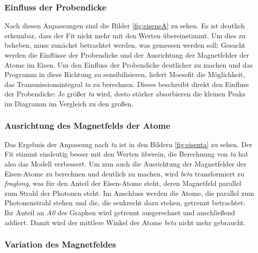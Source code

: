 \documentclass[german, %
parskip=full, %
bibliography=totoc, %
]{scrartcl}
\begin{document}
\subsubsection{Einfluss der Probendicke}

Nach diesen Anpassungen sind die Bilder \ref{fig:eiseneA} zu sehen. Es ist deutlich erkennbar, dass der Fit nicht mehr mit den Werten übereinstimmt. Um dies zu beheben, muss zunächst betrachtet werden, was gemessen werden soll: Gesucht werden die Einflüsse der Probendicke und der Ausrichtung der Magnetfelder der Atome im Eisen. Um den Einfluss der Probendicke deutlicher zu machen und das Programm in diese Richtung zu sensibilisieren, liefert Moessfit die Möglichkeit, das Transmissionsintegral \textit{ta} zu berechnen. Dieses beschreibt direkt den Einfluss der Probendicke: Je größer \textit{ta} wird, desto stärker absorbieren die kleinen Peaks im Diagramm im Vergleich zu den großen. 

\subsubsection{Ausrichtung des Magnetfelds der Atome}

Das Ergebnis der Anpassung nach \textit{ta} ist in den Bildern \ref{fig:eisenta} zu sehen. Der Fit stimmt eindeutig besser mit den Werten überein, die Berechnung von \textit{ta} hat also das Modell verbessert. Um nun auch die Ausrichtung der Magnetfelder der Eisen-Atome zu berechnen und deutlich zu machen, wird \textit{beta} transformiert zu \textit{fraglong}, was für den Anteil der Eisen-Atome steht, deren Magnetfeld parallel zum Strahl der Photonen steht. Im Anschluss werden die Atome, die parallel zum Photonenstrahl stehen und die, die senkrecht dazu stehen, getrennt betrachtet: Ihr Anteil an \textit{A0} des Graphen wird getrennt ausgerechnet und anschließend addiert. Damit wird der mittlere Winkel der Atome \textit{beta} nicht mehr gebraucht. 

\subsubsection{Variation des Magnetfeldes}
\end{document}
